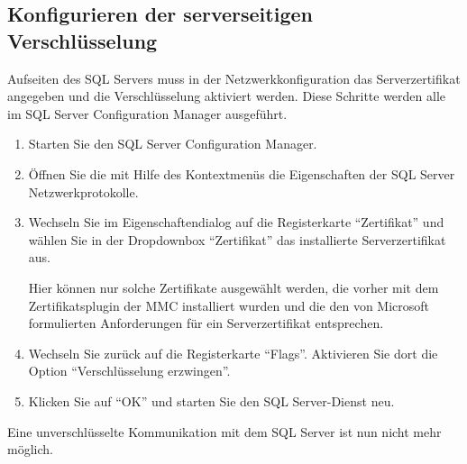       \subsection{Konfigurieren der serverseitigen Verschlüsselung}
        Aufseiten des SQL Servers muss in der Netzwerkkonfiguration das
        Serverzertifikat angegeben und die Verschlüsselung aktiviert werden.
        Diese Schritte werden alle im SQL Server Configuration Manager
        ausgeführt.
        \begin{enumerate}
          \item Starten Sie den SQL Server Configuration Manager.
          \item Öffnen Sie die mit Hilfe des Kontextmenüs die Eigenschaften
          der SQL Server Netzwerkprotokolle.
          \item Wechseln Sie im Eigenschaftendialog auf die Registerkarte
          \enquote{Zertifikat} und wählen Sie in der Dropdownbox
          \enquote{Zertifikat} das installierte Serverzertifikat aus.
          \begin{merke}
            Hier können nur solche Zertifikate ausgewählt werden, die vorher mit
            dem Zertifikatsplugin der MMC installiert wurden und die den von
            Microsoft formulierten Anforderungen für ein Serverzertifikat
            entsprechen.
          \end{merke}
\clearpage
          \item Wechseln Sie zurück auf die Registerkarte \enquote{Flags}.
          Aktivieren Sie dort die Option \enquote{Verschlüsselung erzwingen}.
          \item Klicken Sie auf \enquote{OK} und starten Sie den SQL
          Server-Dienst neu.
        \end{enumerate}
        \begin{merke}
          Eine unverschlüsselte Kommunikation mit dem SQL Server ist nun nicht
          mehr möglich.
        \end{merke}
